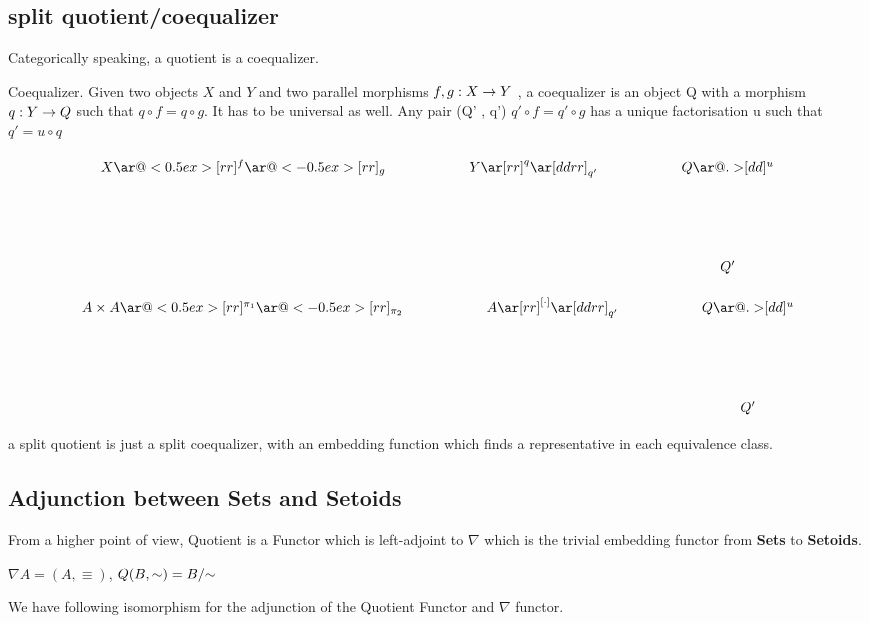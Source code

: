 \subsection{split quotient/coequalizer}

Categorically speaking, a quotient is a coequalizer.

\begin{definition}
Coequalizer.
Given two objects $X$ and $Y$ and two parallel morphisms $f, g : X \rightarrow Y$ , a coequalizer is an object Q with a morphism $q : Y \rightarrow Q$ such that $q \circ f = q \circ g$. It has to be universal as well. Any pair (Q' , q') $q' \circ f = q' \circ g$ has a unique factorisation u such that $q' = u \circ q$
\end{definition}

\begin{displaymath}
    \xymatrix{X \ar@<0.5ex>[rr]^f \ar@<-0.5ex>[rr]_g && Y \ar[rr]^q
      \ar[ddrr]_{q'} && Q
      \ar@{.>}[dd]^u \\ \\
& &&& Q' }
\end{displaymath}


\begin{displaymath}
    \xymatrix{A \times A \ar@<0.5ex>[rr]^{\pi_1} \ar@<-0.5ex>[rr]_{\pi_2} && A \ar[rr]^{[\cdot]}
      \ar[ddrr]_{q'} && Q
      \ar@{.>}[dd]^u \\ \\
& &&& Q' }
\end{displaymath}



a split quotient is just a split coequalizer, with an embedding
function which finds a representative in each equivalence class.


\subsection{Adjunction between {\textbf{Sets}} and \textbf{Setoids}}

From a higher point of view, Quotient is a Functor which is left-adjoint to $\nabla$ which is the trivial embedding functor from \textbf{Sets} to \textbf{Setoids}.

\begin{definition}

$\nabla A = (A , \equiv)$, $Q (B , \sim) = \qset{B}$

\end{definition}

We have following isomorphism for  the adjunction of the Quotient
Functor and $\nabla$ functor.

